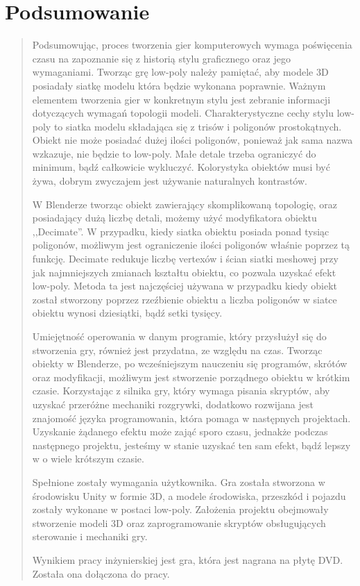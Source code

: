 \chapter{Podsumowanie}
\begin{quotation}
\indent Podsumowując, proces tworzenia gier komputerowych wymaga poświęcenia czasu na zapoznanie się z historią stylu graficznego oraz jego wymaganiami. Tworząc grę low-poly należy pamiętać, aby modele 3D posiadały siatkę modelu która będzie wykonana poprawnie. Ważnym elementem tworzenia gier w konkretnym stylu jest zebranie informacji dotyczących wymagań topologii modeli. Charakterystyczne cechy stylu low-poly to siatka modelu składająca się z trisów i poligonów prostokątnych. Obiekt nie może posiadać dużej ilości poligonów, ponieważ jak sama nazwa wzkazuje, nie będzie to low-poly. Małe detale trzeba ograniczyć do minimum, bądź całkowicie wykluczyć. Kolorystyka obiektów musi być żywa, dobrym zwyczajem jest używanie naturalnych kontrastów.

\indent W Blenderze tworząc obiekt zawierający skomplikowaną topologię, oraz posiadający dużą liczbę detali, możemy użyć modyfikatora obiektu ,,Decimate''. W przypadku, kiedy siatka obiektu posiada ponad tysiąc poligonów, możliwym jest ograniczenie ilości poligonów właśnie poprzez tą funkcję. Decimate redukuje liczbę vertexów i ścian siatki meshowej przy jak najmniejszych zmianach kształtu obiektu, co pozwala uzyskać efekt low-poly. Metoda ta jest najczęściej używana w przypadku kiedy obiekt został stworzony poprzez rzeźbienie obiektu a liczba poligonów w siatce obiektu wynosi dziesiątki, bądź setki tysięcy. 

\indent Umiejętność operowania w danym programie, który przysłużył się do stworzenia gry, również jest przydatna, ze względu na czas. Tworząc obiekty w Blenderze, po wcześniejszym nauczeniu się programów, skrótów oraz modyfikacji, możliwym jest stworzenie porządnego obiektu w krótkim czasie. Korzystając z silnika gry, który wymaga pisania skryptów, aby uzyskać przeróżne mechaniki rozgrywki, dodatkowo rozwijana jest znajomość języka programowania, która pomaga w następnych projektach. Uzyskanie żądanego efektu może zająć sporo czasu, jednakże podczas następnego projektu, jesteśmy w stanie uzyskać ten sam efekt, bądź lepszy w o wiele krótszym czasie.

\indent Spełnione zostały wymagania użytkownika. Gra została stworzona w środowisku Unity w formie 3D, a modele środowiska, przeszkód i pojazdu zostały wykonane w postaci low-poly. Założenia projektu obejmowały stworzenie modeli 3D oraz zaprogramowanie skryptów obsługujących sterowanie i mechaniki gry. 

\indent Wynikiem pracy inżynierskiej jest gra, która jest nagrana na płytę DVD. Została ona dołączona do pracy.
\end{quotation}
